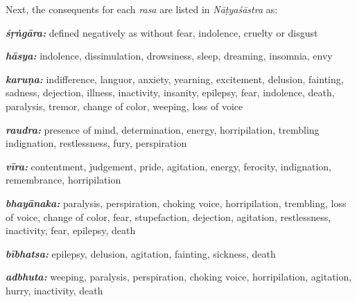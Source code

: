 Next, the consequents for each \textsl{rasa} are listed in \textsl{Nāṭyaśāstra} as: 

\textsl{\textbf{śṛṅgāra:}} defined negatively as without fear, indolence, cruelty or disgust

\textsl{\textbf{hāsya:}} indolence, dissimulation, drowsiness, sleep, dreaming, insomnia, envy

\textsl{\textbf{karuṇa:}} indifference, languor, anxiety, yearning, excitement, delusion, fainting, sadness, dejection, illness, inactivity, insanity, epilepsy, fear, indolence, death, paralysis, tremor, change of color, weeping, loss of voice

\textsl{\textbf{raudra:}} presence of mind, determination, energy, horripilation, trembling indignation, restlessness, fury, perspiration

\textsl{\textbf{vīra:}} contentment, judgement, pride, agitation, energy, ferocity, indignation, remembrance, horripilation

\textsl{\textbf{bhayānaka:}} paralysis, perspiration, choking voice, horripilation, trembling, loss of voice, change of color, fear, stupefaction, dejection, agitation, restlessness, inactivity, fear, epilepsy, death

\textsl{\textbf{bībhatsa:}} epilepsy, delusion, agitation, fainting, sickness, death

\textsl{\textbf{adbhuta:}}
 weeping, paralysis, perspiration, choking voice, horripilation, agitation, hurry, inactivity, death

